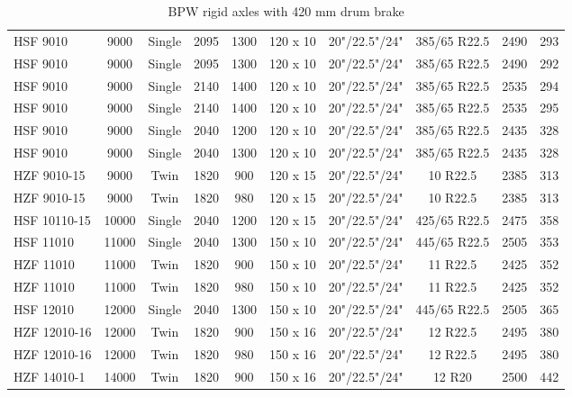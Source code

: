 \begin{table}[H]
\begin{threeparttable}
\begin{tabulary}{\textwidth}{lccccccccc}
    HSF 9010 & 9000  & Single & 2095  & 1300  & 120 x 10 & 20"/22.5"/24" & 385/65 R22.5 & 2490  & 293 \\
    HSF 9010 & 9000  & Single & 2095  & 1300  & 120 x 10 & 20"/22.5"/24" & 385/65 R22.5 & 2490  & 292 \\
    HSF 9010 & 9000  & Single & 2140  & 1400  & 120 x 10 & 20"/22.5"/24" & 385/65 R22.5 & 2535  & 294 \\
    HSF 9010 & 9000  & Single & 2140  & 1400  & 120 x 10 & 20"/22.5"/24" & 385/65 R22.5 & 2535  & 295 \\
    HSF 9010 & 9000  & Single & 2040  & 1200  & 120 x 10 & 20"/22.5"/24" & 385/65 R22.5 & 2435  & 328 \\
    HSF 9010 & 9000  & Single & 2040  & 1300  & 120 x 10 & 20"/22.5"/24" & 385/65 R22.5 & 2435  & 328 \\
    HZF 9010-15 & 9000  & Twin  & 1820  & 900   & 120 x 15 & 20"/22.5"/24" & 10 R22.5 & 2385  & 313 \\
    HZF 9010-15 & 9000  & Twin  & 1820  & 980   & 120 x 15 & 20"/22.5"/24" & 10 R22.5 & 2385  & 313 \\
    HSF 10110-15 & 10000 & Single & 2040  & 1200  & 120 x 15 & 20"/22.5"/24" & 425/65 R22.5 & 2475  & 358 \\
    HSF 11010 & 11000 & Single & 2040  & 1300  & 150 x 10 & 20"/22.5"/24" & 445/65 R22.5 & 2505  & 353 \\
    HZF 11010 & 11000 & Twin  & 1820  & 900   & 150 x 10 & 20"/22.5"/24" & 11 R22.5 & 2425  & 352 \\
    HZF 11010 & 11000 & Twin  & 1820  & 980   & 150 x 10 & 20"/22.5"/24" & 11 R22.5 & 2425  & 352 \\
    HSF 12010 & 12000 & Single & 2040  & 1300  & 150 x 10 & 20"/22.5"/24" & 445/65 R22.5 & 2505  & 365 \\
    HZF 12010-16 & 12000 & Twin  & 1820  & 900   & 150 x 16 & 20"/22.5"/24" & 12 R22.5 & 2495  & 380 \\
    HZF 12010-16 & 12000 & Twin  & 1820  & 980   & 150 x 16 & 20"/22.5"/24" & 12 R22.5 & 2495  & 380 \\
    HZF 14010-1 & 14000 & Twin  & 1820  & 900   & 150 x 16 & 20"/22.5"/24" & 12 R20 & 2500  & 442 \\

	\bottomrule
	\end{tabulary}

	\caption{BPW rigid axles with 420 mm drum brake}
	\label{table:bpw-rigid-axles-with-420-mm-drum-brake}


	\end{threeparttable}
\end{table}

